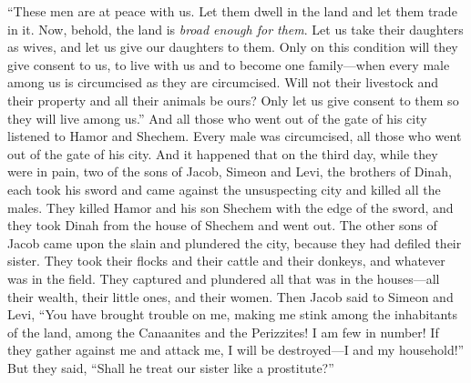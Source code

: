 \begin{biblechapter}
\verse “These men are at peace with us. Let them dwell in the land and let them trade in it. Now, behold, the land is \textit{broad enough for them}. Let us take their daughters as wives, and let us give our daughters to them.
\verse Only on this condition will they give consent to us, to live with us and to become one family—when every male among us is circumcised as they are circumcised.
\verse Will not their livestock and their property and all their animals be ours? Only let us give consent to them so they will live among us.”
\verse And all those who went out of the gate of his city listened to Hamor and Shechem. Every male was circumcised, all those who went out of the gate of his city.
\verse And it happened that on the third day, while they were in pain, two of the sons of Jacob, Simeon and Levi, the brothers of Dinah, each took his sword and came against the unsuspecting city and killed all the males.
\verse They killed Hamor and his son Shechem with the edge of the sword, and they took Dinah from the house of Shechem and went out.
\verse The other sons of Jacob came upon the slain and plundered the city, because they had defiled their sister.
\verse They took their flocks and their cattle and their donkeys, and whatever was in the field.
\verse They captured and plundered all that was in the houses—all their wealth, their little ones, and their women.
\verse Then Jacob said to Simeon and Levi, “You have brought trouble on me, making me stink among the inhabitants of the land, among the Canaanites and the Perizzites! I am few in number! If they gather against me and attack me, I will be destroyed—I and my household!”
\verse But they said, “Shall he treat our sister like a prostitute?”
\end{biblechapter}

